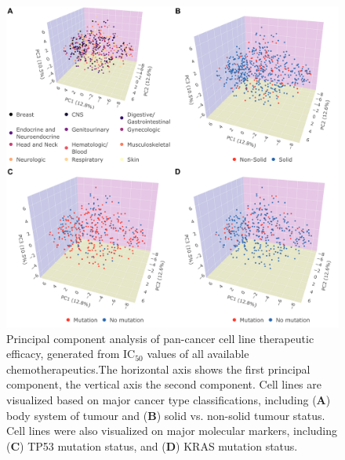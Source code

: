 \documentclass[10pt, letterpaper, twocolumn]{article}
\begin{document}
\begin{figure}[!ht]
	\centering
    \includegraphics[width=\textwidth]{Figures/initial_pca.png}

	\caption{Principal component analysis of pan-cancer cell line therapeutic efficacy, generated from IC$_{50}$ values of all available chemotherapeutics.The horizontal axis shows the first principal component, the vertical axis the second component. Cell lines are visualized based on major cancer type classifications, including (\textbf{A}) body system of tumour and (\textbf{B}) solid vs. non-solid tumour status. Cell lines were also visualized on major molecular markers, including (\textbf{C}) TP53 mutation status, and (\textbf{D}) KRAS mutation status.}
	\label{fig:overall_pca}
\end{figure}
\end{document}
